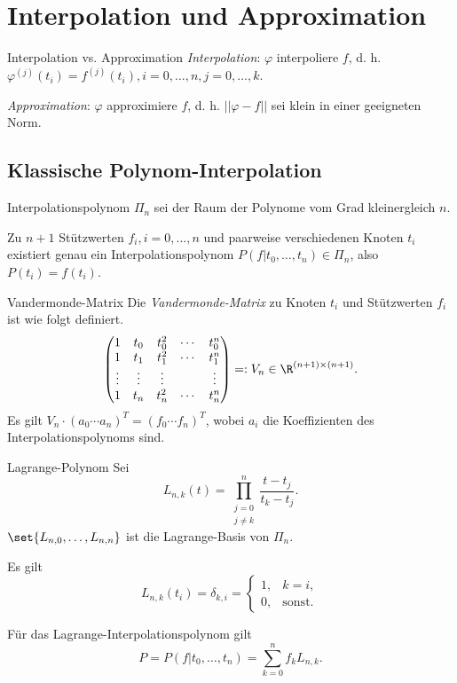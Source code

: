 \section{Interpolation und Approximation}

\begin{karte}{Interpolation vs. Approximation}
	\textit{Interpolation}: \( \varphi \) interpoliere \(f\), d. h.
	\( \varphi^{(j)}(t_i) = f^{(j)}(t_i), i = 0,\ldots, n, j = 0, \ldots, k \).

	\textit{Approximation}: \( \varphi \) approximiere \(f\), d. h. 
	\( ||\varphi - f|| \) sei klein in einer geeigneten Norm.
\end{karte}

\subsection*{Klassische Polynom-Interpolation}

\begin{karte}{Interpolationspolynom}
	\( \Pi_n \) sei der Raum der Polynome vom Grad kleinergleich \(n\).

	Zu \(n+1\) Stützwerten \( f_i, i = 0,\ldots,n \) und paarweise 
	verschiedenen Knoten \( t_i \) existiert genau ein Interpolationspolynom 
	\( P(f|t_0,\ldots, t_n) \in \Pi_n \), also \( P(t_i) = f(t_i) \).
\end{karte}

\begin{karte}{Vandermonde-Matrix}
	Die \textit{Vandermonde-Matrix} zu Knoten \( t_i \) 
	und Stützwerten \( f_i \) ist wie folgt definiert.
	\[ \begin{pmatrix}
		1 & t_0 & t_0^2 & \cdots & t_0^n \\
		1 & t_1 & t_1^2 & \cdots & t_1^n \\
		\vdots & \vdots & \vdots & & \vdots \\
		1 & t_n & t_n^2 & \cdots & t_n^n
	\end{pmatrix} =: V_n \in \R^{(n+1)\times (n+1)}. \]
	Es gilt \( V_n \cdot (a_0 \cdots a_n)^T = (f_0 \cdots f_n)^T \), 
	wobei \( a_i \) die Koeffizienten des Interpolationspolynoms sind.
\end{karte}

\begin{karte}{Lagrange-Polynom}
	Sei 
	\[ L_{n,k}(t) = \prod_{\substack{j=0\\j\neq k}}^n \frac{t - t_j}{t_k - t_j}. \]
	\( \set{L_{n,0}, \ldots, L_{n,n}} \) ist die Lagrange-Basis von \( \Pi_n \).
	
	Es gilt 
	\[ L_{n,k}(t_i) = \delta_{k,i} = \begin{cases}
		1, &k = i, \\
		0, &\text{sonst}.
	\end{cases} \]

	Für das Lagrange-Interpolationspolynom gilt 
	\[ P = P(f|t_0,\ldots, t_n) = \sum_{k=0}^n f_k L_{n,k}. \]
\end{karte}

